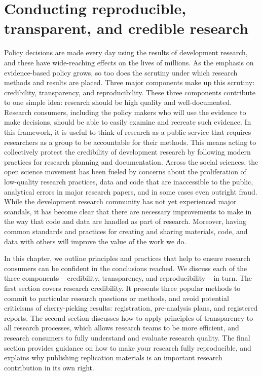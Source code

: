 \documentclass[]{tufte-book}
\begin{document}
\hypertarget{conducting-reproducible-transparent-and-credible-research}{%
\chapter{Conducting reproducible, transparent, and credible
research}\label{conducting-reproducible-transparent-and-credible-research}}

Policy decisions are made every day using the results of development
research, and these have wide-reaching effects on the lives of millions.
As the emphasis on evidence-based policy grows, so too does the scrutiny
under which research methods and results are placed. Three major
components make up this scrutiny: credibility, transparency, and
reproducibility. These three components contribute to one simple idea:
research should be high quality and well-documented. Research consumers,
including the policy makers who will use the evidence to make decisions,
should be able to easily examine and recreate such evidence. In this
framework, it is useful to think of research as a public service that
requires researchers as a group to be accountable for their methods.
This means acting to collectively protect the credibility of development
research by following modern practices for research planning and
documentation. Across the social sciences, the open science movement has
been fueled by concerns about the proliferation of low-quality research
practices, data and code that are inaccessible to the public, analytical
errors in major research papers, and in some cases even outright fraud.
While the development research community has not yet experienced major
scandals, it has become clear that there are necessary improvements to
make in the way that code and data are handled as part of research.
Moreover, having common standards and practices for creating and sharing
materials, code, and data with others will improve the value of the work
we do.

In this chapter, we outline principles and practices that help to ensure
research consumers can be confident in the conclusions reached. We
discuss each of the three components -- credibility, transparency, and
reproducibility -- in turn. The first section covers research
credibility. It presents three popular methods to commit to particular
research questions or methods, and avoid potential criticisms of
cherry-picking results: registration, pre-analysis plans, and registered
reports. The second section discusses how to apply principles of
transparency to all research processes, which allows research teams to
be more efficient, and research consumers to fully understand and
evaluate research quality. The final section provides guidance on how to
make your research fully reproducible, and explains why publishing
replication materials is an important research contribution in its own
right.
\end{document}
